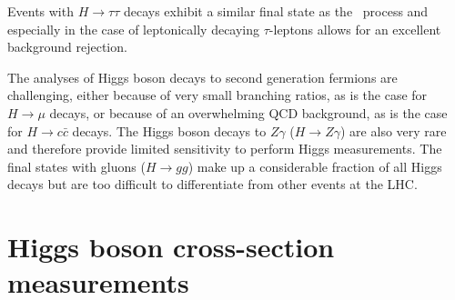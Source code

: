 Events with $H \to \tau\tau $ decays exhibit a similar final state as the \HWW\ process and especially in the case of leptonically decaying $\tau$-leptons allows for an excellent background rejection. 

The analyses of Higgs boson decays to second generation fermions are challenging, either because of very small branching ratios, as is the case for $H \to \mu$ decays, or because of an overwhelming QCD background, as is the case for $H \to c\bar{c}$ decays.
The Higgs boson decays to $Z\gamma$ ($H \to Z\gamma$) are also very rare and therefore provide limited sensitivity to perform Higgs measurements.
The final states with gluons ($H \to gg$) make up a considerable fraction of all Higgs decays but are too difficult to differentiate from other events at the LHC.


\section{Higgs boson cross-section measurements}
\label{subsec:xsec-measurements}



